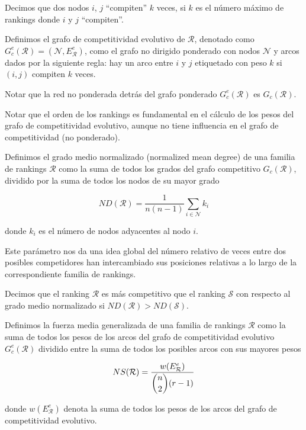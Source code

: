 \begin{defi}
Decimos que dos nodos $i$, $j$ ``compiten'' $k$ veces, si $k$ es el número máximo de rankings donde $i$ y $j$ ``compiten''.
\end{defi}

\begin{defi}
Definimos el grafo de competitividad evolutivo de $\mathcal{R}$, denotado como $G_c^e(\mathcal{R}) = (\mathcal{N}, E_\mathcal{R}^e)$, como el grafo no dirigido ponderado con nodos $\mathcal{N}$ y arcos dados por la siguiente regla: hay un arco entre $i$ y $j$ etiquetado con peso $k$ si $(i,j)$ compiten $k$ veces.  
\end{defi}

\begin{nota}
Notar que la red no ponderada detrás del grafo ponderado $G_c^e(\mathcal{R})$ es $G_c(\mathcal{R})$.
\end{nota}

\begin{nota}
Notar que el orden de los rankings es fundamental en el cálculo de los pesos del grafo de competitividad evolutivo, aunque no tiene influencia en el grafo de competitividad (no ponderado). 
\end{nota}

\begin{defi}
Definimos el grado medio normalizado (normalized mean degree) de una familia de rankings $\mathcal{R}$ como la suma de todos los grados del grafo competitivo $G_c(\mathcal{R})$, dividido por la suma de todos los nodos de su mayor grado

\[ND(\mathcal{R}) = \dfrac{1}{n(n-1)} \sum_{i \in \mathcal{N}} k_i\]

donde $k_i$ es el número de nodos adyacentes al nodo $i$. 
\end{defi}

\begin{ob}
Este parámetro nos da una idea global del número relativo de veces entre dos posibles competidores han intercambiado sus posiciones relativas a lo largo de la correspondiente familia de rankings.
\end{ob}

\begin{defi}
Decimos que el ranking $\mathcal{R}$ es más competitivo que el ranking $\mathcal{S}$ con respecto al grado medio normalizado si $ND(\mathcal{R}) > ND(\mathcal{S})$.
\end{defi}

\begin{defi}
Definimos la fuerza media generalizada de una familia de rankings $\mathcal{R}$ como la suma de todos los pesos de los arcos del grafo de competitividad evolutivo $G_c^e(\mathcal{R})$ dividido entre la suma de todos los posibles arcos con sus mayores pesos

\[ NS(\mathcal{R}) = \dfrac{w(E_\mathcal{R}^e)}{\dbinom{n}{2}(r-1)} \]

donde  $w(E_\mathcal{R}^e)$ denota la suma de todos los pesos de los arcos del grafo de competitividad evolutivo.
\end{defi}

